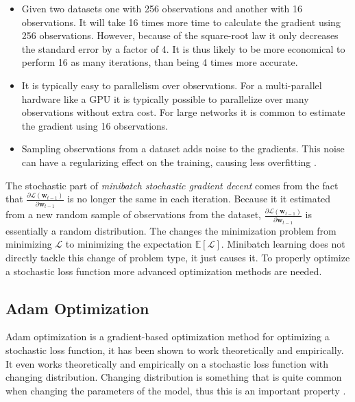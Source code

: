 \begin{itemize}
\item Given two datasets one with 256 observations and another with 16 observations. It will take 16 times more time to calculate the gradient using 256 observations. However, because of the square-root law it only decreases the standard error by a factor of 4. It is thus likely to be more economical to perform 16 as many iterations, than being 4 times more accurate.

\item It is typically easy to parallelism over observations. For a multi-parallel hardware like a GPU it is typically possible to parallelize over many observations without extra cost. For large networks it is common to estimate the gradient using 16 observations.

\item Sampling observations from a dataset adds noise to the gradients. This noise can have a regularizing effect on the training, causing less overfitting \cite{deep-learning}.
\end{itemize}

The stochastic part of \textit{minibatch stochastic gradient decent} comes from the fact that $\frac{\partial \mathcal{L}(\mathbf{w}_{t-1})}{\partial \mathbf{w}_{t-1}}$ is no longer the same in each iteration. Because it it estimated from a new random sample of observations from the dataset, $\frac{\partial \mathcal{L}(\mathbf{w}_{t-1})}{\partial \mathbf{w}_{t-1}}$ is essentially a random distribution. The changes the minimization problem from minimizing $\mathcal{L}$ to minimizing the expectation $\mathbb{E}[\mathcal{L}]$. Minibatch learning does not directly tackle this change of problem type, it just causes it. To properly optimize a stochastic loss function more advanced optimization methods are needed.

\subsection{Adam Optimization}

Adam optimization is a gradient-based optimization method for optimizing a stochastic loss function, it has been shown to work theoretically and empirically. It even works theoretically and empirically on a stochastic loss function with changing distribution. Changing distribution is something that is quite common when changing the parameters of the model, thus this is an important property \cite{adam-optimization}.

